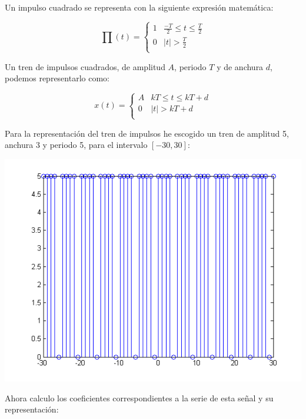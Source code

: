\documentclass[a4paper,12pt]{article}
\begin{document}
\begin{enumerate}
Un impulso cuadrado se representa con la siguiente expresión matemática:

\begin{displaymath}
\prod(t) = \left\{ \begin{array}{ll}
1 & \frac{-T}{2} \leq t \leq \frac{T}{2} \\
0 & |t| > \frac{T}{2} \\
\end{array}
\right.
\end{displaymath}

Un tren de impulsos cuadrados, de amplitud $A$, periodo $T$ y de anchura $d$, podemos representarlo como:

\begin{displaymath}
x(t) = \left\{ \begin{array}{ll}
A & kT \leq t \leq kT +d \\
0 & |t| > kT + d \\
\end{array}
\right.
\end{displaymath}



Para la representación del tren de impulsos he escogido un tren de amplitud 5, anchura 3 y periodo 5, para el intervalo $[-30,30]$:



\begin{center}
\includegraphics[width=.8 \textwidth]{../ejercicio-3-a.png}
\end{center}

Ahora calculo los coeficientes correspondientes a la serie de esta señal y su representación:




\end{enumerate}
\end{document}

